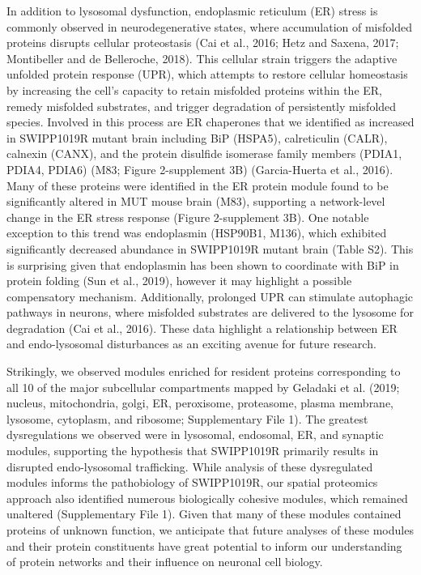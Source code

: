 In addition to lysosomal dysfunction, endoplasmic reticulum (ER) stress is
commonly observed in neurodegenerative states, where accumulation of misfolded
proteins disrupts cellular proteostasis (Cai et al., 2016; Hetz and Saxena,
2017; Montibeller and de Belleroche, 2018). This cellular strain triggers the
adaptive unfolded protein response (UPR), which attempts to restore cellular
homeostasis by increasing the cell’s capacity to retain misfolded proteins
within the ER, remedy misfolded substrates, and trigger degradation of
persistently misfolded species. Involved in this process are ER chaperones that
we identified as increased in SWIPP1019R mutant brain including BiP (HSPA5),
calreticulin (CALR), calnexin (CANX), and the protein disulfide isomerase family
members (PDIA1, PDIA4, PDIA6) (M83; Figure 2-supplement 3B) (Garcia-Huerta et
al., 2016). Many of these proteins were identified in the ER protein module
found to be significantly altered in MUT mouse brain (M83), supporting a
network-level change in the ER stress response (Figure 2-supplement 3B). One
notable exception to this trend was endoplasmin (HSP90B1, M136), which exhibited
significantly decreased abundance in SWIPP1019R mutant brain (Table S2). This is
surprising given that endoplasmin has been shown to coordinate with BiP in
protein folding (Sun et al., 2019), however it may highlight a possible
compensatory mechanism. Additionally, prolonged UPR can stimulate autophagic
pathways in neurons, where misfolded substrates are delivered to the lysosome
for degradation (Cai et al., 2016). These data highlight a relationship between
ER and endo-lysosomal disturbances as an exciting avenue for future research. 

Strikingly, we observed modules enriched for resident proteins corresponding to
all 10 of the major subcellular compartments mapped by Geladaki et al. (2019;
nucleus, mitochondria, golgi, ER, peroxisome, proteasome, plasma membrane,
lysosome, cytoplasm, and ribosome; Supplementary File 1). The greatest
dysregulations we observed were in lysosomal, endosomal, ER, and synaptic
modules, supporting the hypothesis that SWIPP1019R primarily results in
disrupted endo-lysosomal trafficking. While analysis of these dysregulated
modules informs the pathobiology of SWIPP1019R, our spatial proteomics approach
also identified numerous biologically cohesive modules, which remained unaltered
(Supplementary File 1). Given that many of these modules contained proteins of
unknown function, we anticipate that future analyses of these modules and their
protein constituents have great potential to inform our understanding of protein
networks and their influence on neuronal cell biology. 

